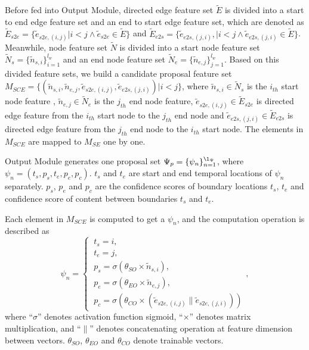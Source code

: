 \documentclass[runningheads]{llncs}
\begin{document}
Before fed into Output Module, directed edge feature set $\tilde E$ is divided into a start to end edge feature set and an end to start edge feature set, which are denoted as $\tilde E_{s2e} = \{\tilde e_{s2e,(i, j)}|i<j \land \tilde  e_{s2e} \in \tilde E\}$ and
 $\tilde E_{e2s} = \{
 \tilde e_{e2s,(j, i)},
 |i<j \land \tilde e_{e2s,(j, i)} \in \tilde E\}$.
Meanwhile, node feature set $\tilde N$ is divided into a start node feature set $\tilde N_s = \{\tilde n_{s,i}\}_{i=1}^{l_w}$ and an end node feature set $\tilde N_e=\{\tilde n_{e,j}\}_{j=1}^{l_w}$.
Based on this divided feature sets, we build a candidate proposal feature set
$M_{SCE} =
\{( \tilde n_{s,i}, \tilde n_{e,j},\tilde e_{s2e,(i, j)}, \tilde e_{e2s,(j,i)})
|i<j
\}
$, where $\tilde n_{s,i} \in \tilde N_s$ is the $i_{th}$ start node feature ,
 $\tilde n_{e,j} \in \tilde N_e$ is the $j_{th}$ end node feature,
 $\tilde e_{s2e,(i, j)} \in \tilde E_{s2e}$ is directed edge feature from the $i_{th}$ start node to the $j_{th}$ end node
 and $ \tilde e_{e2s,(j,i)} \in \tilde E_{e2s}$ is directed edge feature from the $j_{th}$ end node to the $i_{th}$ start node. The elements in $M_{SCE}$ are mapped to $M_{SE}$ one by one.

Output Module generates one proposal set $\Psi_p = \{\psi_n\}_{n=1}^{\l_\Psi}$, where $\psi_n = (t_{s}, p_{s}, t_{e}, p_{e}, p_{c})$.  $t_{s}$ and $t_{e}$ are start and end temporal locations of $\psi_n$ separately. $p_{s}$, $p_{e}$ and $p_{c}$ are the confidence scores of boundary locations $t_{s}$, $t_{e}$ and confidence score of content between boundaries $t_{s}$ and $t_{e}$.

Each element in $M_{SCE}$ is computed to get a $\psi_n$, and the computation operation is described as
\begin{equation}
\psi_n =
\begin{cases}
 \ t_{s} = i,
 \\
 \ t_{e} = j,
 \\
 \ p_{s} = \sigma(\theta_{SO} \times \tilde n_{s, i}),
 \\
 \ p_{e} = \sigma(\theta_{EO} \times \tilde n_{e,j}),
 \\
 \ p_{c} = \sigma({\theta_{CO} \times (\tilde e_{s2e, (i, j)} \| \tilde e_{{s2e,(j,i)}})})
\end{cases},
\end{equation}
where ``$\sigma$'' denotes activation function sigmoid, ``$\times$'' denotes matrix multiplication, and ``$\|$'' denotes concatenating operation at feature dimension between vectors. $\theta_{SO}$, $\theta_{EO}$ and $\theta_{CO}$ denote trainable vectors.
\end{document}
